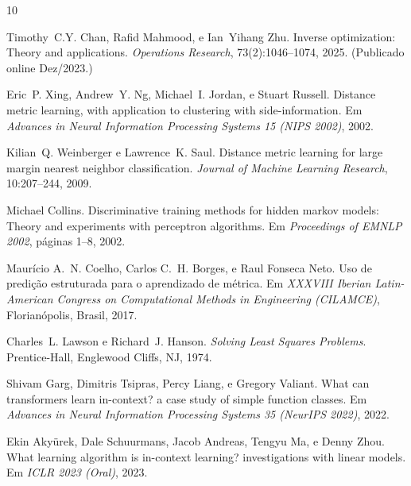 \documentclass[12pt,a4paper]{article}
\begin{document}

\begin{thebibliography}{10}

Timothy~C.Y. Chan, Rafid Mahmood, e Ian~Yihang Zhu.
\newblock Inverse optimization: Theory and applications.
\newblock \emph{Operations Research}, 73(2):1046--1074, 2025.
\newblock (Publicado online Dez/2023.)

Eric~P. Xing, Andrew~Y. Ng, Michael~I. Jordan, e Stuart Russell.
\newblock Distance metric learning, with application to clustering with
  side-information.
\newblock Em \emph{Advances in Neural Information Processing Systems 15 (NIPS
  2002)}, 2002.

Kilian~Q. Weinberger e Lawrence~K. Saul.
\newblock Distance metric learning for large margin nearest neighbor
  classification.
\newblock \emph{Journal of Machine Learning Research}, 10:207--244, 2009.

Michael Collins.
\newblock Discriminative training methods for hidden markov models: Theory and
  experiments with perceptron algorithms.
\newblock Em \emph{Proceedings of EMNLP 2002}, páginas 1--8, 2002.

Maurício A.~N. Coelho, Carlos C.~H. Borges, e Raul Fonseca Neto.
\newblock Uso de predição estruturada para o aprendizado de métrica.
\newblock Em \emph{XXXVIII Iberian Latin-American Congress on Computational Methods
  in Engineering (CILAMCE)}, Florianópolis, Brasil, 2017.

Charles~L. Lawson e Richard~J. Hanson.
\newblock \emph{Solving Least Squares Problems}.
\newblock Prentice-Hall, Englewood Cliffs, NJ, 1974.

Shivam Garg, Dimitris Tsipras, Percy Liang, e Gregory Valiant.
\newblock What can transformers learn in-context? a case study of simple
  function classes.
\newblock Em \emph{Advances in Neural Information Processing Systems 35
  (NeurIPS 2022)}, 2022.

Ekin Akyürek, Dale Schuurmans, Jacob Andreas, Tengyu Ma, e Denny Zhou.
\newblock What learning algorithm is in-context learning? investigations with
  linear models.
\newblock Em \emph{ICLR 2023 (Oral)}, 2023.


\end{thebibliography}
\end{document}

